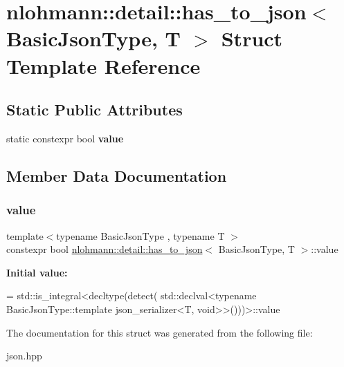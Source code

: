 \hypertarget{structnlohmann_1_1detail_1_1has__to__json}{}\section{nlohmann\+:\+:detail\+:\+:has\+\_\+to\+\_\+json$<$ Basic\+Json\+Type, T $>$ Struct Template Reference}
\label{structnlohmann_1_1detail_1_1has__to__json}
\subsection*{Static Public Attributes}
\begin{DoxyCompactItemize}
\item 
static constexpr bool {\bfseries value}
\end{DoxyCompactItemize}


\subsection{Member Data Documentation}
\mbox{\label{structnlohmann_1_1detail_1_1has__to__json_a18e260c3c6f10328637c4427d3cb3a31}} 
\subsubsection{\texorpdfstring{value}{value}}
{\footnotesize\ttfamily template$<$typename Basic\+Json\+Type , typename T $>$ \\
constexpr bool \hyperlink{structnlohmann_1_1detail_1_1has__to__json}{nlohmann\+::detail\+::has\+\_\+to\+\_\+json}$<$ Basic\+Json\+Type, T $>$\+::value\hspace{0.3cm}{\ttfamily [static]}}

{\bfseries Initial value\+:}
\begin{DoxyCode}
= std::is\_integral<decltype(detect(
                                      std::declval<\textcolor{keyword}{typename} BasicJsonType::template json\_serializer<T,
       void>>()))>::value
\end{DoxyCode}


The documentation for this struct was generated from the following file\+:\begin{DoxyCompactItemize}
\item 
json.\+hpp\end{DoxyCompactItemize}
